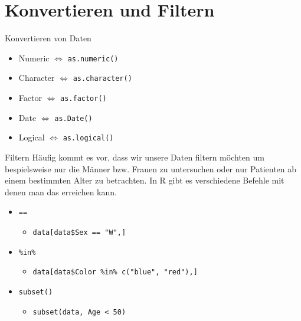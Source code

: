 \documentclass[xcolor=dvipsnames, aspectratio = 169]{beamer}
\begin{document}
\section{Konvertieren und Filtern}
\begin{frame}[fragile]{Konvertieren von Daten}
	\begin{itemize}
		\item Numeric $\Leftrightarrow$ \verb+as.numeric()+
		\item Character $\Leftrightarrow$ \verb+as.character()+
		\item Factor $\Leftrightarrow$ \verb+as.factor()+
		\item Date $\Leftrightarrow$ \verb+as.Date()+
		\item Logical $\Leftrightarrow$ \verb+as.logical()+
	\end{itemize}
\end{frame}



\begin{frame}[fragile]{Filtern}
Häufig kommt es vor, dass wir unsere Daten filtern möchten um bespielsweise nur die Männer bzw. Frauen zu untersuchen oder nur Patienten ab einem bestimmten Alter zu betrachten. In R gibt es verschiedene Befehle mit denen man das erreichen kann.
	\begin{itemize}
		\item  \verb+==+
		\begin{itemize}
			\item  \verb+data[data$Sex == "W",]+
		\end{itemize}
		\item  \verb+%in%+
		\begin{itemize}
			\item  \verb+data[data$Color %in% c("blue", "red"),]+
		\end{itemize}
		\item  \verb+subset()+
		\begin{itemize}
			\item  \verb+subset(data, Age < 50)+
		\end{itemize}
	\end{itemize}
\end{frame}
\end{document}
